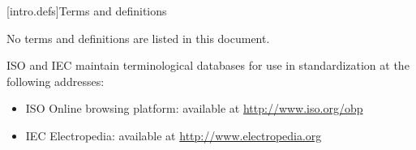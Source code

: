 
[intro.defs]{Terms and definitions}

\setcounter{section}{1}
\setcounter{tocdepth}{0}

\setcounter{tocdepth}{1}

No terms and definitions are listed in this document.

ISO and IEC maintain terminological databases for use in standardization at 
the following addresses:
\begin{itemize}
    \item ISO Online browsing platform: available at \url{http://www.iso.org/obp}
    \item IEC Electropedia: available at \url{http://www.electropedia.org}
\end{itemize}


